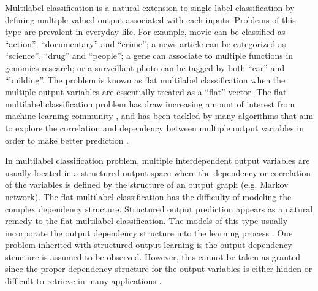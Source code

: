 Multilabel classification is a natural extension to single-label classification by defining multiple valued output associated with each inputs.
Problems of this type are prevalent in everyday life.
For example, movie can be classified as ``action'', ``documentary'' and ``crime''; a news article can be categorized as ``science'', ``drug'' and ``people''; a gene can associate to multiple functions in genomics research; or a surveillant photo can be tagged by both ``car'' and ``building''. 
The problem is known as flat multilabel classification when the multiple output variables are essentially treated as a ``flat'' vector.
The flat multilabel classification problem has draw increasing amount of interest from machine learning community \citep{Tsoumakas07multi,Tsoumakas10mining}, and has been tackled by many algorithms that aim to explore the correlation and dependency between multiple output variables in order to make better prediction \citep{Read09classifier,Cheng09combining,Bian12corrlog}.

In multilabel classification problem, multiple interdependent output variables are usually located in a structured output space where the dependency or correlation of the variables is defined by the structure of an output graph (e.g. Markov network).
The flat multilabel classification has the difficulty of modeling the complex dependency structure.
Structured output prediction appears as a natural remedy to the flat multilabel classification.
The models of this type usually incorporate the output dependency structure into the learning process \citep{lafferty01,taskar02,Taskar04max,THJA04}.
One problem inherited with structured output learning is the output dependency structure is assumed to be observed.
However, this cannot be taken as granted since the proper dependency structure for the output variables is either hidden or difficult to retrieve in many applications \citep{Chickering94learning}.

